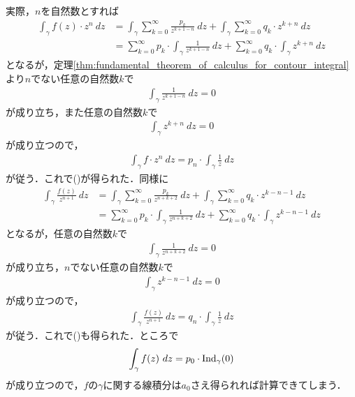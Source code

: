 	実際，$n$を自然数とすれば
	\begin{align}
		\int_{\gamma} f(z) \cdot z^{n}\ dz
		&= \int_{\gamma} \sum_{k=0}^{\infty} \frac{p_{k}}{z^{k+1-n}}\ dz
			+ \int_{\gamma} \sum_{k=0}^{\infty} q_{k} \cdot z^{k+n}\ dz \\
		&= \sum_{k=0}^{\infty} p_{k} \cdot \int_{\gamma} \frac{1}{z^{k+1-n}}\ dz
			+ \sum_{k=0}^{\infty} q_{k} \cdot \int_{\gamma} z^{k+n}\ dz
	\end{align}
	となるが，定理\ref{thm:fundamental_theorem_of_calculus_for_contour_integral}より$n$でない任意の自然数$k$で
	\begin{align}
		\int_{\gamma} \frac{1}{z^{k+1-n}}\ dz = 0
	\end{align}
	が成り立ち，また任意の自然数$k$で
	\begin{align}
		\int_{\gamma} z^{k+n}\ dz = 0
	\end{align}
	が成り立つので，
	\begin{align}
		\int_{\gamma} f \cdot z^{n}\ dz = p_{n} \cdot \int_{\gamma} \frac{1}{z}\ dz
	\end{align}
	が従う．これで()が得られた．同様に
	\begin{align}
		\int_{\gamma} \frac{f(z)}{z^{n+1}}\ dz
		&= \int_{\gamma} \sum_{k=0}^{\infty} \frac{p_{k}}{z^{n+k+2}}\ dz
			+ \int_{\gamma} \sum_{k=0}^{\infty} q_{k} \cdot z^{k-n-1}\ dz \\
		&= \sum_{k=0}^{\infty} p_{k} \cdot \int_{\gamma} \frac{1}{z^{n+k+2}}\ dz
			+ \sum_{k=0}^{\infty} q_{k} \cdot \int_{\gamma} z^{k-n-1}\ dz
	\end{align}
	となるが，任意の自然数$k$で
	\begin{align}
		\int_{\gamma} \frac{1}{z^{n+k+2}}\ dz = 0
	\end{align}
	が成り立ち，$n$でない任意の自然数$k$で
	\begin{align}
		\int_{\gamma} z^{k-n-1}\ dz = 0
	\end{align}
	が成り立つので，
	\begin{align}
		\int_{\gamma} \frac{f(z)}{z^{n+1}}\ dz
		= q_{n} \cdot \int_{\gamma} \frac{1}{z}\ dz
	\end{align}
	が従う．これで()も得られた．ところで
	\begin{align}
		\int_{\gamma} f(z)\ dz = p_{0} \cdot \operatorname{Ind}_{\gamma}(0)
	\end{align}
	が成り立つので，$f$の$\gamma$に関する線積分は$a_{0}$さえ得られれば計算できてしまう．
	
